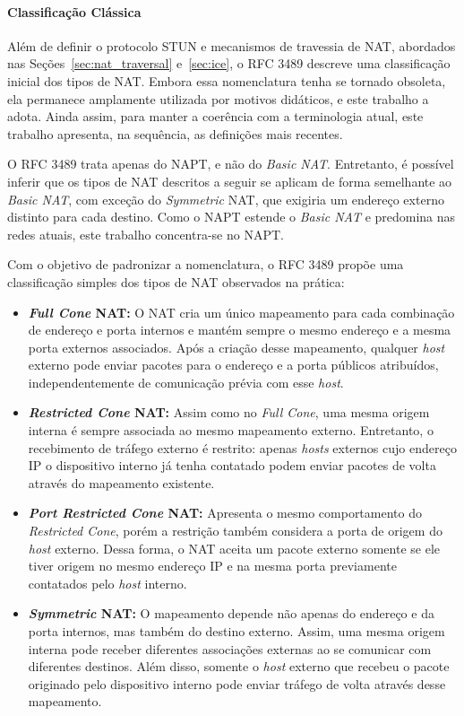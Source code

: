 \paragraph{Classificação Clássica}

Além de definir o protocolo STUN e mecanismos de travessia de NAT, abordados nas Seções~\ref{sec:nat_traversal} e~\ref{sec:ice}, o RFC 3489 descreve uma classificação inicial dos tipos de NAT. Embora essa nomenclatura tenha se tornado obsoleta, ela permanece amplamente utilizada por motivos didáticos, e este trabalho a adota. Ainda assim, para manter a coerência com a terminologia atual, este trabalho apresenta, na sequência, as definições mais recentes.

O RFC 3489 trata apenas do NAPT, e não do \textit{Basic NAT}. Entretanto, é possível inferir que os tipos de NAT descritos a seguir se aplicam de forma semelhante ao \textit{Basic NAT}, com exceção do \textit{Symmetric} NAT, que exigiria um endereço externo distinto para cada destino. Como o NAPT estende o \textit{Basic NAT} e predomina nas redes atuais, este trabalho concentra-se no NAPT.

Com o objetivo de padronizar a nomenclatura, o RFC 3489 propõe uma classificação simples dos tipos de NAT observados na prática:

\begin{itemize}
    \item \textbf{\textit{Full Cone} NAT:} O NAT cria um único mapeamento para cada combinação de endereço e porta internos e mantém sempre o mesmo endereço e a mesma porta externos associados. Após a criação desse mapeamento, qualquer \textit{host} externo pode enviar pacotes para o endereço e a porta públicos atribuídos, independentemente de comunicação prévia com esse \textit{host}.
    \item \textbf{\textit{Restricted Cone} NAT:} Assim como no \textit{Full Cone}, uma mesma origem interna é sempre associada ao mesmo mapeamento externo. Entretanto, o recebimento de tráfego externo é restrito: apenas \textit{hosts} externos cujo endereço IP o dispositivo interno já tenha contatado podem enviar pacotes de volta através do mapeamento existente.
    \item \textbf{\textit{Port Restricted Cone} NAT:} Apresenta o mesmo comportamento do \textit{Restricted Cone}, porém a restrição também considera a porta de origem do \textit{host} externo. Dessa forma, o NAT aceita um pacote externo somente se ele tiver origem no mesmo endereço IP e na mesma porta previamente contatados pelo \textit{host} interno.
    \item \textbf{\textit{Symmetric} NAT:} O mapeamento depende não apenas do endereço e da porta internos, mas também do destino externo. Assim, uma mesma origem interna pode receber diferentes associações externas ao se comunicar com diferentes destinos. Além disso, somente o \textit{host} externo que recebeu o pacote originado pelo dispositivo interno pode enviar tráfego de volta através desse mapeamento.
\end{itemize}

